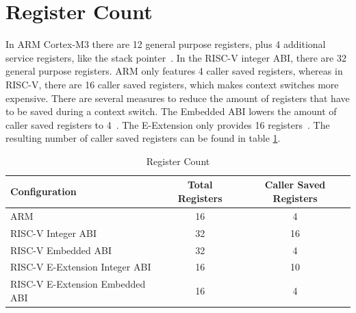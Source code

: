 \section{Register Count}
\label{sec:register_count}
In ARM Cortex-M3 there are 12 general purpose registers, plus 4 additional service registers, like the stack pointer~\cite{ARMRegisters}. In the RISC-V integer ABI, there are 32 general purpose registers\cite{RISCVIntegerABI}. ARM only features 4 caller saved registers, whereas in RISC-V, there are 16 caller saved registers, which makes context switches more expensive. There are several measures to reduce the amount of registers that have to be saved during a context switch. The Embedded ABI lowers the amount of caller saved registers to 4~\cite{RISCVEmbeddedABI}. The E-Extension only provides 16 registers~\cite{RISCVEExtension}. The resulting number of caller saved registers can be found in table \ref{tbl:register_counts}.

\begin{table}
  \centerfloat
  \begin{tabular}{ l c c }
    \toprule
    \textbf{Configuration} & \textbf{Total Registers} & \textbf{Caller Saved Registers} \\
    \midrule
    ARM & 16 & 4 \\
    RISC-V Integer ABI & 32 & 16 \\
    RISC-V Embedded ABI & 32 & 4 \\
    RISC-V E-Extension Integer ABI & 16 & 10 \\
    RISC-V E-Extension Embedded ABI & 16 & 4 \\
    \bottomrule
  \end{tabular}
  \caption{Register Count}%
  \label{tbl:register_counts}
\end{table}